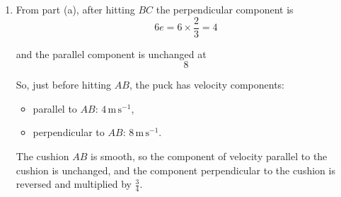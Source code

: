 \documentclass[leqno]{article}
\begin{document}
\begin{enumerate}[
  label=\textbf{\arabic*.},
  leftmargin=*,
  topsep=0pt,
  partopsep=0pt,
  parsep=0pt
]
\begin{djsSolution}
\begin{enumerate}[label=\textbf{(\alph*)}]
  Since $\tan \alpha=\frac{3}{4}$, we can use the $3$-$4$-$5$ triangle:
  \[
  \sin\alpha=\frac{3}{5}, \qquad \cos\alpha=\frac{4}{5}
  \]

  Before hitting $BC$, the speed is $10\,\mathrm{m\,s}^{-1}$, so
  \begin{align*}
  \text{component perpendicular to }BC &= 10\sin\alpha = 10\times \frac35 = 6 \\
  \text{component parallel to }BC &= 10\cos\alpha = 10\times \frac45 = 8
  \end{align*}

  The cushion $BC$ is smooth, so the component of velocity parallel to the cushion is unchanged, and the component perpendicular to the cushion is reversed and multiplied by $e$. So after hitting $BC$ the parallel component is still $8$.

  The coefficient of restitution is
  \[
  e=\dfrac{\text{speed of separation perpendicular to the cushion}}{\text{speed of approach perpendicular to the cushion}}
  \]

  The speed of approach perpendicular to $BC$ is $6$, so the speed of separation perpendicular to $BC$ is
  \[
  6e
  \]

  After impact, the puck moves at angle $\beta$ to $BC$, with $\tan\beta=\frac12$. Therefore
  \[
  \tan\beta=\frac{\text{perpendicular component}}{\text{parallel component}}
  =\frac{6e}{8}
  \]

  Hence
  \[
  \frac{6e}{8}=\frac12
  \]
  \begin{align*}
  12e &= 8 \\
  e &= \frac{8}{12}=\frac23
  \end{align*}


  \item From part (a), after hitting $BC$ the perpendicular component is
  \[
  6e = 6\times \frac23 = 4
  \]

  and the parallel component is unchanged at
  \[
  8
  \]

  So, just before hitting $AB$, the puck has velocity components:
  \begin{itemize}
    \item parallel to $AB$: $4\,\mathrm{m\,s}^{-1}$,
    \item perpendicular to $AB$: $8\,\mathrm{m\,s}^{-1}$.
  \end{itemize}

  The cushion $AB$ is smooth, so the component of velocity parallel to the cushion is unchanged, and the component perpendicular to the cushion is reversed and multiplied by $\frac34$.


\end{enumerate}
\end{djsSolution}
\end{enumerate}
\end{document}
